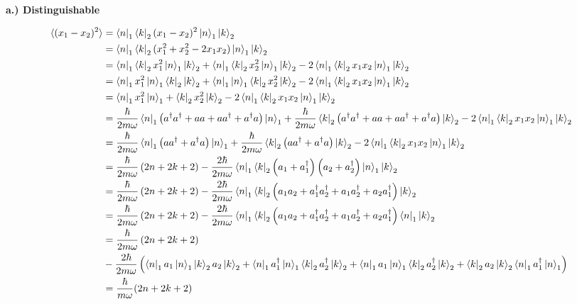 \documentclass[10pt]{article} %
\begin{document}
\textbf{a.) Distinguishable}

\begin{align*}
  \braket{(x_1-x_2)^2} &= \bra{n}_1\bra{k}_2(x_1-x_2)^2\ket{n}_1\ket{k}_2\\
  &= \bra{n}_1\bra{k}_2(x_1^2 + x_2^2 - 2x_1x_2)\ket{n}_1\ket{k}_2\\
  &= \bra{n}_1\bra{k}_2x_1^2\ket{n}_1\ket{k}_2 +
  \bra{n}_1\bra{k}_2x_2^2\ket{n}_1\ket{k}_2 - 2\bra{n}_1\bra{k}_2x_1x_2\ket{n}_1\ket{k}_2\\
  &= \bra{n}_1x_1^2\ket{n}_1\bra{k}_2\ket{k}_2 +
  \bra{n}_1\ket{n}_1\bra{k}_2x_2^2\ket{k}_2 - 2\bra{n}_1\bra{k}_2x_1x_2\ket{n}_1\ket{k}_2\\
  &= \bra{n}_1x_1^2\ket{n}_1 + \bra{k}_2x_2^2\ket{k}_2
  - 2\bra{n}_1\bra{k}_2x_1x_2\ket{n}_1\ket{k}_2\\
  &= \frac{\hbar}{2m\omega}\bra{n}_1
  \left(a^\dagger a^\dagger + aa + aa^\dagger + a^\dagger a\right)\ket{n}_1
  + \frac{\hbar}{2m\omega}\bra{k}_2
  \left(a^\dagger a^\dagger + aa + aa^\dagger + a^\dagger a\right)\ket{k}_2
  - 2\bra{n}_1\bra{k}_2x_1x_2\ket{n}_1\ket{k}_2\\
  &= \frac{\hbar}{2m\omega}\bra{n}_1\left(aa^\dagger + a^\dagger a\right)\ket{n}_1
  + \frac{\hbar}{2m\omega}\bra{k}_2\left(aa^\dagger + a^\dagger a\right)\ket{k}_2
  - 2\bra{n}_1\bra{k}_2x_1x_2\ket{n}_1\ket{k}_2\\
  &= \frac{\hbar}{2m\omega}\left(2n + 2k + 2\right)
  - \frac{2\hbar}{2m\omega}\bra{n}_1\bra{k}_2
  \left(a_1+a_1^\dagger\right)\left(a_2+a_2^\dagger\right)\ket{n}_1\ket{k}_2\\
  &= \frac{\hbar}{2m\omega}\left(2n + 2k + 2\right)
  - \frac{2\hbar}{2m\omega}\bra{n}_1\bra{k}_2
  \left(a_1a_2 + a_1^\dagger a_2^\dagger + a_1a_2^\dagger + a_2a_1^\dagger\right)\ket{k}_2\\
  &= \frac{\hbar}{2m\omega}\left(2n + 2k + 2\right)
  - \frac{2\hbar}{2m\omega}\bra{n}_1\bra{k}_2
  \left(a_1a_2 + a_1^\dagger a_2^\dagger + a_1a_2^\dagger + a_2a_1^\dagger\right)\bra{n}_1\ket{k}_2\\
  &= \frac{\hbar}{2m\omega}\left(2n + 2k + 2\right)\\
  &- \frac{2\hbar}{2m\omega}
  \left(\bra{n}_1a_1\ket{n}_1\ket{k}_2a_2\ket{k}_2
  + \bra{n}_1a_1^\dagger\ket{n}_1\bra{k}_2a_2^\dagger\ket{k}_2
  + \bra{n}_1a_1\ket{n}_1\bra{k}_2a_2^\dagger\ket{k}_2
  + \bra{k}_2a_2\ket{k}_2\bra{n}_1a_1^\dagger\ket{n}_1\right)\\
  &= \frac{\hbar}{m\omega}(2n+2k+2)\\
\end{align*}
\end{document}
